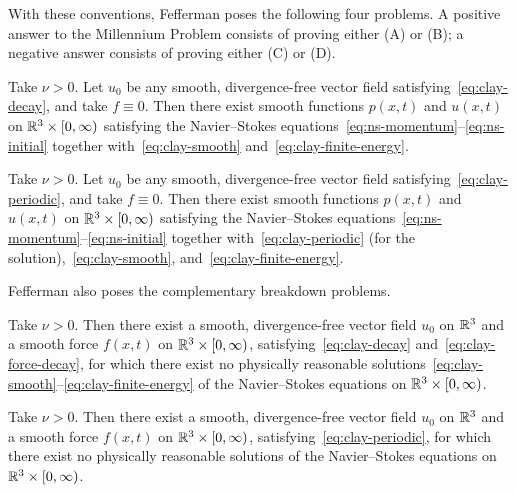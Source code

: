 With these conventions, Fefferman poses the following four problems.  A positive answer
to the Millennium Problem consists of proving either (A) or (B); a negative answer
consists of proving either (C) or (D).

\begin{conjecture}%
  \label{conj:clay-A}
  Take $\nu > 0$.  Let $u_{0}$ be any smooth, divergence-free vector field
  satisfying~\eqref{eq:clay-decay}, and take $f \equiv 0$.  Then there exist smooth
  functions $p(x,t)$ and $u(x,t)$ on $\mathbb{R}^{3} \times [0, \infty)$ satisfying the
  Navier--Stokes equations~\eqref{eq:ns-momentum}--\eqref{eq:ns-initial} together
  with~\eqref{eq:clay-smooth} and~\eqref{eq:clay-finite-energy}.
\end{conjecture}

\begin{conjecture}%
  \label{conj:clay-B}
  Take $\nu > 0$.  Let $u_{0}$ be any smooth, divergence-free vector field
  satisfying~\eqref{eq:clay-periodic}, and take $f \equiv 0$.  Then there exist smooth
  functions $p(x,t)$ and $u(x,t)$ on $\mathbb{R}^{3} \times [0, \infty)$ satisfying the
  Navier--Stokes equations~\eqref{eq:ns-momentum}--\eqref{eq:ns-initial} together
  with~\eqref{eq:clay-periodic} (for the solution),~\eqref{eq:clay-smooth},
  and~\eqref{eq:clay-finite-energy}.
\end{conjecture}

Fefferman also poses the complementary breakdown problems.

\begin{conjecture}%
  \label{conj:clay-C}
  Take $\nu > 0$.  Then there exist a smooth, divergence-free vector field $u_{0}$ on
  $\mathbb{R}^{3}$ and a smooth force $f(x,t)$ on $\mathbb{R}^{3} \times [0, \infty)$,
  satisfying~\eqref{eq:clay-decay} and~\eqref{eq:clay-force-decay}, for which there exist
  no physically reasonable
  solutions~\eqref{eq:clay-smooth}--\eqref{eq:clay-finite-energy} of the Navier--Stokes
  equations on $\mathbb{R}^{3} \times [0, \infty)$.
\end{conjecture}

\begin{conjecture}%
  \label{conj:clay-D}
  Take $\nu > 0$.  Then there exist a smooth, divergence-free vector field $u_{0}$ on
  $\mathbb{R}^{3}$ and a smooth force $f(x,t)$ on $\mathbb{R}^{3} \times [0, \infty)$,
  satisfying~\eqref{eq:clay-periodic}, for which there exist no physically reasonable
  solutions of the Navier--Stokes equations on $\mathbb{R}^{3} \times [0, \infty)$.
\end{conjecture}


